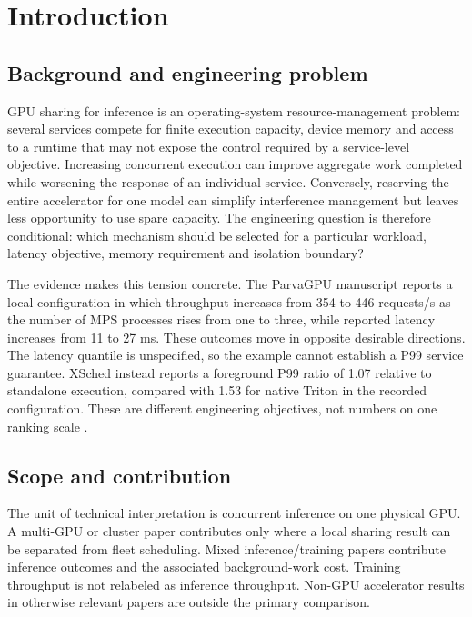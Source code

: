 \section{Introduction}
\subsection{Background and engineering problem}
GPU sharing for inference is an operating-system resource-management problem: several services compete for finite execution capacity, device memory and access to a runtime that may not expose the control required by a service-level objective. Increasing concurrent execution can improve aggregate work completed while worsening the response of an individual service. Conversely, reserving the entire accelerator for one model can simplify interference management but leaves less opportunity to use spare capacity. The engineering question is therefore conditional: which mechanism should be selected for a particular workload, latency objective, memory requirement and isolation boundary?

The evidence makes this tension concrete. The ParvaGPU manuscript reports a local configuration in which throughput increases from 354 to 446 requests/s as the number of MPS processes rises from one to three, while reported latency increases from 11 to 27 ms. These outcomes move in opposite desirable directions. The latency quantile is unspecified, so the example cannot establish a P99 service guarantee. XSched instead reports a foreground P99 ratio of 1.07 relative to standalone execution, compared with 1.53 for native Triton in the recorded configuration. These are different engineering objectives, not numbers on one ranking scale \cite{P011,P015}.

\subsection{Scope and contribution}
The unit of technical interpretation is concurrent inference on one physical GPU. A multi-GPU or cluster paper contributes only where a local sharing result can be separated from fleet scheduling. Mixed inference/training papers contribute inference outcomes and the associated background-work cost. Training throughput is not relabeled as inference throughput. Non-GPU accelerator results in otherwise relevant papers are outside the primary comparison.

